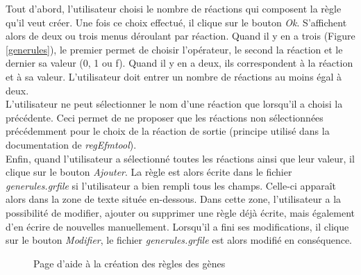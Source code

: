 Tout d'abord, l'utilisateur choisi le nombre de réactions qui composent la règle qu'il veut créer.
Une fois ce choix effectué, il clique sur le bouton \emph{Ok}. S'affichent alors de deux ou trois menus déroulant par réaction. Quand il y en a trois (Figure \ref{generules}), le premier permet de choisir l'opérateur, le second la réaction et le dernier sa valeur (0, 1 ou f). Quand il y en a deux, ils correspondent à la réaction et à sa valeur. L'utilisateur doit entrer un nombre de réactions au moins égal à deux.\\

L'utilisateur ne peut sélectionner le nom d'une réaction que lorsqu'il a choisi la précédente. Ceci permet de ne proposer que les réactions non sélectionnées précédemment pour le choix de la  réaction de sortie (principe utilisé dans la documentation de \textit{regEfmtool}).\\

Enfin, quand l'utilisateur a sélectionné toutes les réactions ainsi que leur valeur, il clique sur le bouton \emph{Ajouter}. La règle est alors écrite dans le fichier \emph{generules.grfile} si l'utilisateur a bien rempli tous les champs. Celle-ci apparaît alors dans la zone de texte située en-dessous. Dans cette zone, l'utilisateur a la possibilité de modifier, ajouter ou supprimer une règle déjà écrite, mais également d'en écrire de nouvelles manuellement. Lorsqu'il a fini ses modifications, il clique sur le bouton \emph{Modifier}, le fichier \emph{generules.grfile} est alors modifié en conséquence.\\

\begin{figure}[!ht]
	\begin{center}
		\caption{Page d'aide à la création des règles des gènes}
  		\label{helpGenerules}
  	\end{center}	
\end{figure}

